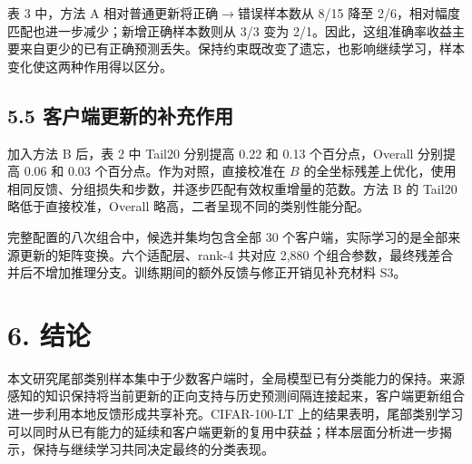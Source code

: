 \documentclass[10pt,twocolumn,letterpaper]{article}
\begin{document}
表 3 中，方法 A 相对普通更新将正确$\rightarrow$错误样本数从 8/15 降至 2/6，相对幅度匹配也进一步减少；新增正确样本数则从 3/3 变为 2/1。因此，这组准确率收益主要来自更少的已有正确预测丢失。保持约束既改变了遗忘，也影响继续学习，样本变化使这两种作用得以区分。


\subsection*{5.5 客户端更新的补充作用}

加入方法 B 后，表 2 中 Tail20 分别提高 0.22 和 0.13 个百分点，Overall 分别提高 0.06 和 0.03 个百分点。作为对照，直接校准在 $B$ 的全坐标残差上优化，使用相同反馈、分组损失和步数，并逐步匹配有效权重增量的范数。方法 B 的 Tail20 略低于直接校准，Overall 略高，二者呈现不同的类别性能分配。


完整配置的八次组合中，候选并集均包含全部 30 个客户端，实际学习的是全部来源更新的矩阵变换。六个适配层、rank-4 共对应 2,880 个组合参数，最终残差合并后不增加推理分支。训练期间的额外反馈与修正开销见补充材料 S3。


\section*{6. 结论}

本文研究尾部类别样本集中于少数客户端时，全局模型已有分类能力的保持。来源感知的知识保持将当前更新的正向支持与历史预测间隔连接起来，客户端更新组合进一步利用本地反馈形成共享补充。CIFAR-100-LT 上的结果表明，尾部类别学习可以同时从已有能力的延续和客户端更新的复用中获益；样本层面分析进一步揭示，保持与继续学习共同决定最终的分类表现。


\clearpage

\end{document}

